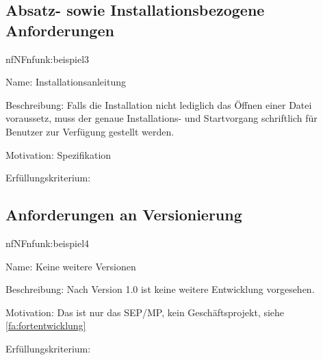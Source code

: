%

\subsection{Absatz- sowie Installationsbezogene Anforderungen}

\begin{description}[leftmargin=5em, style=sameline]	
	\begin{lhp}{nf}{NF}{nfunk:beispiel3}
		\item [Name:] Installationsanleitung	
		\item [Beschreibung:] Falls die Installation nicht lediglich das Öffnen einer Datei voraussetz, muss der genaue Installations- und Startvorgang schriftlich für Benutzer zur Verfügung gestellt werden.
		\item [Motivation:] Spezifikation
		\item [Erfüllungskriterium:] 
	\end{lhp}
\end{description}

\subsection{Anforderungen an Versionierung}

\begin{description}[leftmargin=5em, style=sameline]	
	\begin{lhp}{nf}{NF}{nfunk:beispiel4}
		\item [Name:] Keine weitere Versionen
		\item [Beschreibung:] Nach Version 1.0 ist keine weitere Entwicklung vorgesehen.
		\item [Motivation:] Das ist nur das SEP/MP, kein Geschäftsprojekt, siehe \ref{fa:fortentwicklung}
		\item [Erfüllungskriterium:] 
	\end{lhp}
\end{description}

